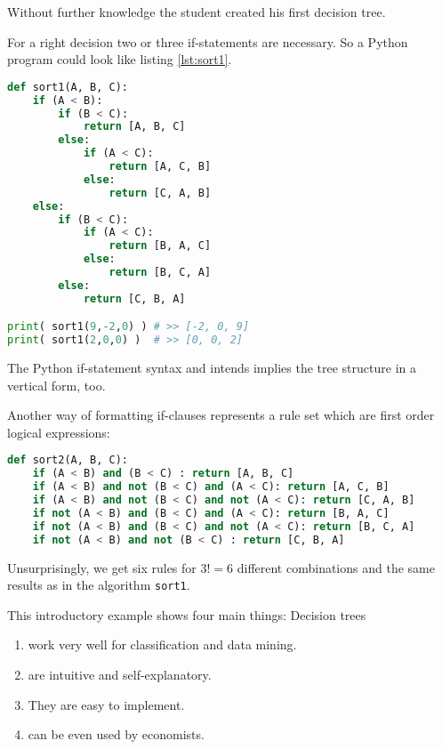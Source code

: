 Without further knowledge the student created his first decision tree.

For a right decision two or three if-statements are necessary. So a Python program could look like listing \ref{lst:sort1}.

\newpage

\begin{lstlisting}[style = siemens, language = Python, caption={[A Python implementation of a decision tree for sorting three elements]A Python implementation of a decision tree for sorting three elements $A, B, C$},label=lst:sort1]
def sort1(A, B, C):
	if (A < B):
		if (B < C):
			return [A, B, C]
		else:
			if (A < C):
				return [A, C, B]
			else:
				return [C, A, B]
	else:
		if (B < C):
			if (A < C):
				return [B, A, C]
			else:
				return [B, C, A]
		else:
			return [C, B, A]

print( sort1(9,-2,0) ) # >> [-2, 0, 9]
print( sort1(2,0,0) )  # >> [0, 0, 2]
\end{lstlisting}

\begin{remark}
    The Python if-statement syntax and intends implies the tree structure in a vertical form, too.      
\end{remark}

Another way of formatting if-clauses represents a rule set which are first order logical expressions:  
    \begin{lstlisting}[style = siemens, language = Python, caption={A Python reimplementation of the decision tree given in listing \ref{lst:sort1} as a set of first order logical rules},label=lst:sort2]
def sort2(A, B, C):
	if (A < B) and (B < C) : return [A, B, C]
	if (A < B) and not (B < C) and (A < C): return [A, C, B]
	if (A < B) and not (B < C) and not (A < C): return [C, A, B]
	if not (A < B) and (B < C) and (A < C): return [B, A, C]
	if not (A < B) and (B < C) and not (A < C): return [B, C, A]
	if not (A < B) and not (B < C) : return [C, B, A]
\end{lstlisting}

Unsurprisingly, we get six rules for $3! = 6$ different combinations and the same results as in the algorithm \texttt{sort1}. 


This introductory example shows four main things: Decision trees
\begin{enumerate}
    \item work very well for classification and data mining.
    \item are intuitive and self-explanatory.
    \item They are easy to implement.
    \item can be even used by economists.
\end{enumerate}

